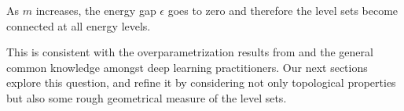 \begin{corollary}
\label{maincoro}
As $m$ increases, the energy gap $\epsilon$ goes to zero and therefore the level sets become connected at all energy levels.
\end{corollary}
This is consistent with the overparametrization results from \cite{safran2015quality,shamir2} and the general common knowledge amongst deep learning practitioners. Our next sections explore this question, and refine it by considering not only topological properties but also some rough geometrical measure of the level sets.








